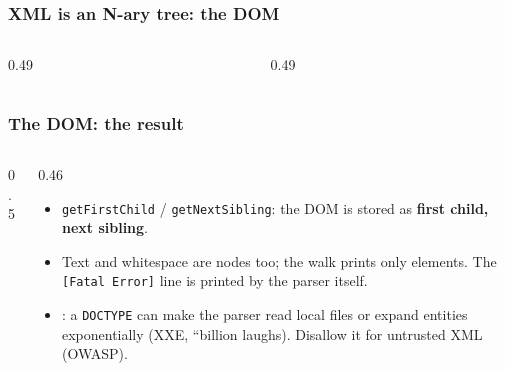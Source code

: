 \documentclass[aspectratio=169,10pt,compress]{beamer}
\begin{document}




\begin{frame}[t,fragile] \frametitle{XML is an N-ary tree: the DOM}
  \begin{columns}[T]
    \begin{column}{0.49\textwidth}
    \end{column}
    \begin{column}{0.49\textwidth}
    \end{column}
  \end{columns}
\end{frame}




\begin{frame}[t,fragile] \frametitle{The DOM: the result}
  \begin{columns}[T]
    \begin{column}{0.5\textwidth}
    \end{column}
    \begin{column}{0.46\textwidth}
      \begin{itemize}\small
        \item \texttt{getFirstChild} / \texttt{getNextSibling}: the DOM is stored as \textbf{first child, next sibling}.
        \item Text and whitespace are nodes too; the walk prints only elements. The \texttt{[Fatal Error]} line is printed by the parser itself.
        \item {}: a \texttt{DOCTYPE} can make the parser read local files or expand entities exponentially (XXE, ``billion laughs). Disallow it for untrusted XML (OWASP).
      \end{itemize}
    \end{column}
  \end{columns}
\end{frame}
\end{document}

